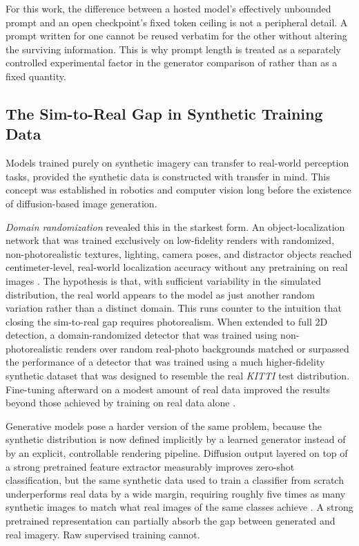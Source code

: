 For this work, the difference between a hosted model's effectively unbounded prompt and an open checkpoint's fixed token ceiling is not a peripheral detail. A prompt written for one cannot be reused verbatim for the other without altering the surviving information. This is why prompt length is treated as a separately controlled experimental factor in the generator comparison of  rather than as a fixed quantity.

\subsection{The Sim-to-Real Gap in Synthetic Training Data}\label{sec:lit_sim_to_real}

Models trained purely on synthetic imagery can transfer to real-world perception tasks, provided the synthetic data is constructed with transfer in mind. This concept was established in robotics and computer vision long before the existence of diffusion-based image generation.

\textit{Domain randomization} revealed this in the starkest form. An object-localization network that was trained exclusively on low-fidelity renders with randomized, non-photorealistic textures, lighting, camera poses, and distractor objects reached centimeter-level, real-world localization accuracy without any pretraining on real images \cite{tobinDomainRandomizationTransferring2017}. The hypothesis is that, with sufficient variability in the simulated distribution, the real world appears to the model as just another random variation rather than a distinct domain. This runs counter to the intuition that closing the sim-to-real gap requires photorealism. When extended to full 2D detection, a domain-randomized detector that was trained using non-photorealistic renders over random real-photo backgrounds matched or surpassed the performance of a detector that was trained using a much higher-fidelity synthetic dataset that was designed to resemble the real \textit{KITTI} test distribution. Fine-tuning afterward on a modest amount of real data improved the results beyond those achieved by training on real data alone \cite{tremblayTrainingDeepNetworks2018}.

Generative models pose a harder version of the same problem, because the synthetic distribution is now defined implicitly by a learned generator instead of by an explicit, controllable rendering pipeline. Diffusion output layered on top of a strong pretrained feature extractor measurably improves zero-shot classification, but the same synthetic data used to train a classifier from scratch underperforms real data by a wide margin, requiring roughly five times as many synthetic images to match what real images of the same classes achieve \cite{heSyntheticDataGenerative2023}. A strong pretrained representation can partially absorb the gap between generated and real imagery. Raw supervised training cannot.

